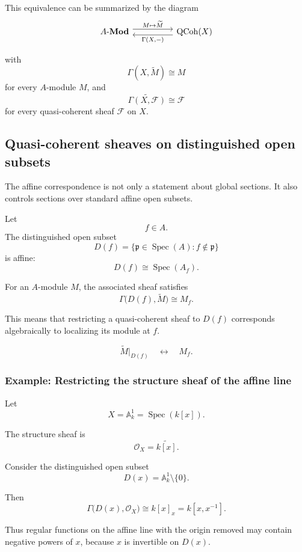 \documentclass[12pt,a4paper]{article}
\theoremstyle{notespace}
\begin{document}
This equivalence can be summarized by the diagram
\[
\begin{tikzcd}[column sep=huge]
	A\text{-}\mathbf{Mod}
	\arrow[r, shift left=.8ex, "{M\mapsto\widetilde{M}}"]
	&
	\operatorname{QCoh}(X)
	\arrow[l, shift left=.8ex, "{\Gamma(X,-)}"]
\end{tikzcd}
\]

with
\[
\Gamma(X,\widetilde{M})\cong M
\]
for every \(A\)-module \(M\), and
\[
\widetilde{\Gamma(X,\mathcal{F})}
\cong
\mathcal{F}
\]
for every quasi-coherent sheaf \(\mathcal{F}\) on \(X\).

\subsection{Quasi-coherent sheaves on distinguished open subsets}

The affine correspondence is not only a statement about global sections. It
also controls sections over standard affine open subsets.

Let
\[
f\in A.
\]
The distinguished open subset
\[
D(f)
=
\{\mathfrak{p}\in\operatorname{Spec}(A): f\notin\mathfrak{p}\}
\]
is affine:
\[
D(f)\cong \operatorname{Spec}(A_{f}).
\]

For an \(A\)-module \(M\), the associated sheaf satisfies
\[
\Gamma\bigl(D(f),\widetilde{M}\bigr)
\cong
M_{f}.
\]

This means that restricting a quasi-coherent sheaf to \(D(f)\) corresponds
algebraically to localizing its module at \(f\).

\[
\boxed{
	\widetilde{M}|_{D(f)}
	\quad\longleftrightarrow\quad
	M_{f}.
}
\]

\subsubsection{Example: Restricting the structure sheaf of the affine line}

Let
\[
X=\mathbb{A}^{1}_{k}
=
\operatorname{Spec}(k[x]).
\]

The structure sheaf is
\[
\mathcal{O}_{X}
=
\widetilde{k[x]}.
\]

Consider the distinguished open subset
\[
D(x)
=
\mathbb{A}^{1}_{k}\setminus\{0\}.
\]

Then
\[
\Gamma\bigl(D(x),\mathcal{O}_{X}\bigr)
\cong
k[x]_{x}
=
k[x,x^{-1}].
\]

Thus regular functions on the affine line with the origin removed may contain
negative powers of \(x\), because \(x\) is invertible on \(D(x)\).
\end{document}
